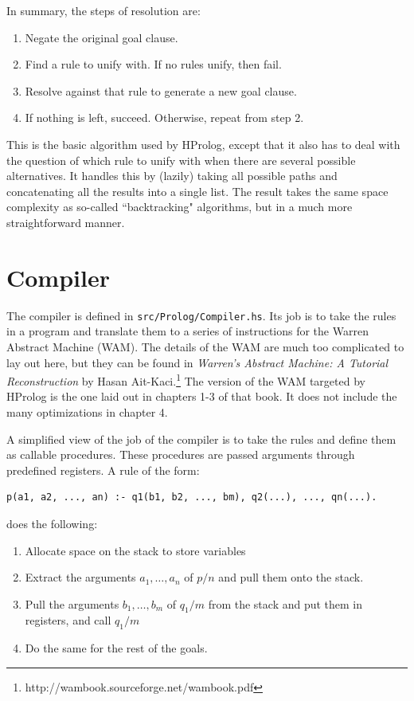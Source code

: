 \documentclass[11pt]{report}
\begin{document}
In summary, the steps of resolution are:
\begin{enumerate}
\item Negate the original goal clause.
\item Find a rule to unify with. If no rules unify, then fail.
\item Resolve against that rule to generate a new goal clause.
\item If nothing is left, succeed. Otherwise, repeat from step 2.
\end{enumerate}

This is the basic algorithm used by HProlog, except that it also has to deal with the question of which rule to unify with when there are several possible alternatives. It handles this by (lazily) taking all possible paths and concatenating all the results into a single list. The result takes the same space complexity as so-called ``backtracking" algorithms, but in a much more straightforward manner.


\section{Compiler}

The compiler is defined in \texttt{src/Prolog/Compiler.hs}. Its job is to take the rules in a program and translate them to a series of instructions for the Warren Abstract Machine (WAM). The details of the WAM are much too complicated to lay out here, but they can be found in \emph{Warren's Abstract Machine: A Tutorial Reconstruction} by Hasan Ait-Kaci.\footnote{http://wambook.sourceforge.net/wambook.pdf} The version of the WAM targeted by HProlog is the one laid out in chapters 1-3 of that book. It does not include the many optimizations in chapter 4.

A simplified view of the job of the compiler is to take the rules and define them as callable procedures. These procedures are passed arguments through predefined registers. A rule of the form:
\begin{verbatim}
p(a1, a2, ..., an) :- q1(b1, b2, ..., bm), q2(...), ..., qn(...).
\end{verbatim}
does the following:
\begin{enumerate}
\item Allocate space on the stack to store variables
\item Extract the arguments $a_1, \ldots, a_n$ of $p/n$ and pull them onto the stack.
\item Pull the arguments $b_1, \ldots, b_m$ of $q_1/m$ from the stack and put them in registers, and call $q_1/m$
\item Do the same for the rest of the goals.
\end{enumerate}
\end{document}
